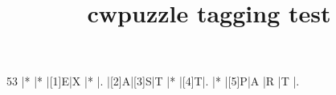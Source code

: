 \documentclass{article}
\title{cwpuzzle tagging test}
\begin{document}
\begin{Puzzle}{5}{3}%
|* |* |[1]E|X |* |.
|[2]A|[3]S|T |* |[4]T|.
|* |[5]P|A |R |T |.
\end{Puzzle}
\end{document}
